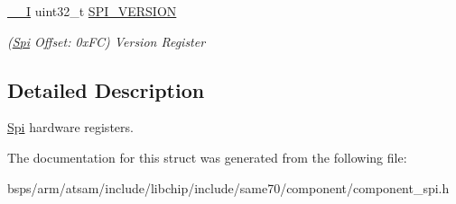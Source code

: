 \begin{DoxyCompactItemize}
\item 
\mbox{\label{structSpi_a477c1fc32f2ef0ba6fde99fd54c8c490}} 
\mbox{\hyperlink{core__cm7_8h_af63697ed9952cc71e1225efe205f6cd3}{\+\_\+\+\_\+I}} uint32\+\_\+t \mbox{\hyperlink{structSpi_a477c1fc32f2ef0ba6fde99fd54c8c490}{S\+P\+I\+\_\+\+V\+E\+R\+S\+I\+ON}}
\begin{DoxyCompactList}\small\item\em (\mbox{\hyperlink{structSpi}{Spi}} Offset\+: 0x\+FC) Version Register \end{DoxyCompactList}\end{DoxyCompactItemize}


\subsection{Detailed Description}
\mbox{\hyperlink{structSpi}{Spi}} hardware registers. 

The documentation for this struct was generated from the following file\+:\begin{DoxyCompactItemize}
\item 
bsps/arm/atsam/include/libchip/include/same70/component/component\+\_\+spi.\+h\end{DoxyCompactItemize}
